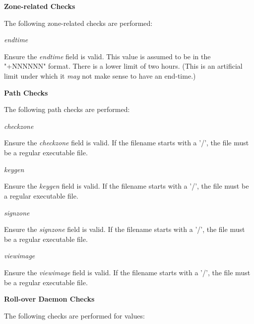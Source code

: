 {\bf Zone-related Checks}

The following zone-related checks are performed:

\begin{description}

\item {\it endtime}\verb" "

Ensure the {\it endtime} field is valid.  This value is assumed to be in the
"+NNNNNN" format.  There is a lower limit of two hours.  (This is an
artificial limit under which it {\it may} not make sense to have an end-time.)

\end{description}

{\bf Path Checks}

The following path checks are performed:

\begin{description}

\item {\it checkzone}\verb" "

Ensure the {\it checkzone} field is valid.  If the filename starts with a '/',
the file must be a regular executable file.

\item {\it keygen}\verb" "

Ensure the {\it keygen} field is valid.  If the filename starts with a '/',
the file must be a regular executable file.

\item {\it signzone}\verb" "

Ensure the {\it signzone} field is valid.  If the filename starts with a '/',
the file must be a regular executable file.

\item {\it viewimage}\verb" "

Ensure the {\it viewimage} field is valid.  If the filename starts with a '/',
the file must be a regular executable file.

\end{description}

{\bf Roll-over Daemon Checks}

The following checks are performed for  values:

